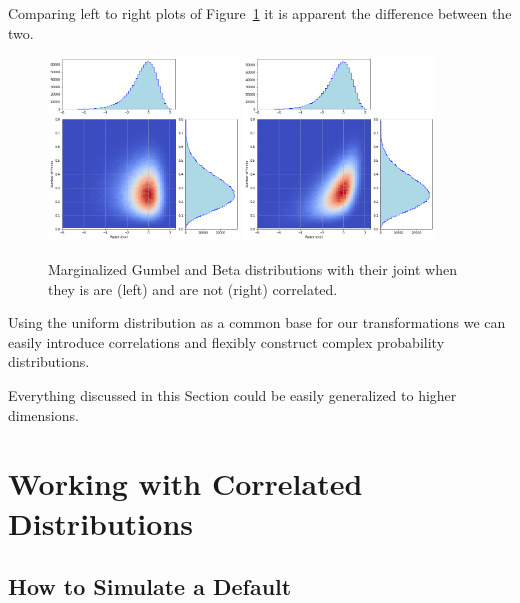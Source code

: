 Comparing left to right plots of Figure~\ref{fig:gumbel_beta_with_corr} it is apparent the difference between the two.

\begin{ipython}
\end{ipython}

\begin{figure}[htbp]
\centering
\includegraphics[width=0.45\textwidth]{figures/gumbel_beta_uncorr}
\quad
\includegraphics[width=0.45\textwidth]{figures/gumbel_beta_corr}
\caption{Marginalized Gumbel and Beta distributions with their joint when they is are (left) and are not (right) correlated.}
\label{fig:gumbel_beta_with_corr}
\end{figure}
    
Using the uniform distribution as a common base for our transformations we can easily introduce correlations and flexibly construct complex probability distributions. 

Everything discussed in this Section could be easily generalized to higher dimensions.

\section{Working with Correlated Distributions}
\label{generate-correlated-distributions}

\subsection{How to Simulate a Default}

